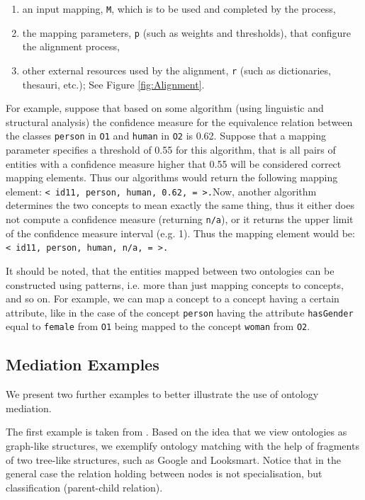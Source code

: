 \documentclass{fast_latex}
\begin{document}
\begin{enumerate}
\item an input mapping, \texttt{M}, which is to be used and
completed by the process, 
\item the mapping parameters, \texttt{p} (such as weights
and thresholds), that configure the alignment process, 
\item other external resources used by the alignment,
\texttt{r} (such as dictionaries, thesauri, etc.); See Figure \ref{fig:Alignment}. 
\end{enumerate}
For example, suppose that based on some algorithm (using linguistic and
structural analysis) the confidence measure for the equivalence
relation between the classes \texttt{person} in
\texttt{O1} and \texttt{human} in
\texttt{O2} is 0.62. Suppose that a mapping parameter
specifies a threshold of 0.55 for this algorithm, that is all pairs of
entities with a confidence measure higher that 0.55 will be considered
correct mapping elements. Thus our algorithms would return the
following mapping element: \texttt{{\textless} id11,
person, human, 0.62, = {\textgreater}.}Now, another algorithm
determines the two concepts to mean exactly the same thing, thus it
either does not compute a confidence measure (returning
\texttt{n/a}), or it returns the upper limit of the
confidence measure interval (e.g. 1). Thus the mapping element would
be: \texttt{{\textless} id11, person, human, n/a, =
{\textgreater}.} 

It should be noted, that the entities mapped between two ontologies can
be constructed using patterns, i.e. more than just mapping concepts to
concepts, and so on. For example, we can map a concept to a concept
having a certain attribute, like in the case of the concept
\texttt{person} having the attribute
\texttt{hasGender} equal to \texttt{female}
from \texttt{O1} being mapped to the concept
\texttt{woman} from \texttt{O2}. 

\subsection{Mediation Examples}
\label{subsec:mediationproblem_examples}
We present two further examples to better illustrate the use of ontology
mediation. 

The first example is taken from \cite{giunchiglia2008evaluation}. Based on the
idea that we view ontologies as graph-like structures, we exemplify
ontology matching with the help of fragments of two tree-like
structures, such as Google and Looksmart. Notice that in the general
case the relation holding between nodes is not specialisation, but
classification (parent-child relation). 
\end{document}
